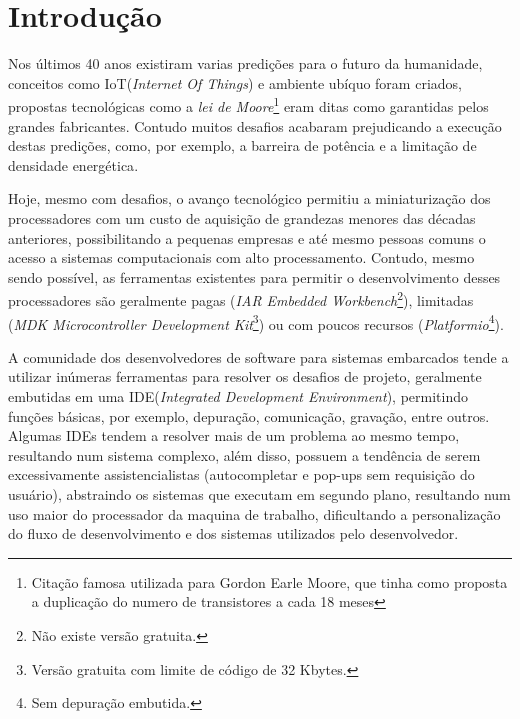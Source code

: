 \chapter{Introdução}
Nos últimos 40 anos existiram varias predições para o futuro da humanidade, conceitos como IoT(\textit{Internet Of Things})\cite{gates1995estrada} e ambiente ubíquo\cite{weiser1991computer} foram criados, propostas tecnológicas como a \textit{lei de Moore}\footnote{Citação famosa utilizada para Gordon Earle Moore, que tinha como proposta a duplicação do numero de transistores a cada 18 meses} eram ditas como garantidas pelos grandes fabricantes. Contudo muitos desafios acabaram prejudicando a execução destas predições, como, por exemplo, a barreira de potência\cite{Patterson:2008:COD:1502247} e a limitação de densidade energética\cite{paradiso2005energy}.

Hoje, mesmo com desafios, o avanço tecnológico permitiu a miniaturização dos processadores com um custo de aquisição de grandezas menores das décadas anteriores\cite{nordhaus2007two}, possibilitando a pequenas empresas e até mesmo pessoas comuns o acesso a sistemas computacionais com alto processamento. Contudo, mesmo	 sendo possível, as ferramentas existentes para permitir o desenvolvimento desses processadores são geralmente pagas (\textit{IAR Embedded Workbench}\footnote{Não existe versão gratuita.}), limitadas (\textit{MDK Microcontroller Development Kit}\footnote{Versão gratuita com limite de código de 32 Kbytes.}) ou com poucos recursos (\textit{Platformio}\footnote{Sem depuração embutida.}).

A comunidade dos desenvolvedores de software para sistemas embarcados tende a utilizar inúmeras ferramentas para resolver os desafios de projeto, geralmente embutidas em uma IDE(\textit{Integrated Development Environment}), permitindo funções básicas, por exemplo, depuração, comunicação, gravação, entre outros. Algumas IDEs tendem a resolver mais de um problema ao mesmo tempo, resultando num sistema complexo, além disso, possuem a tendência de serem excessivamente assistencialistas (autocompletar e pop-ups sem requisição do usuário), abstraindo os sistemas que executam em segundo plano, resultando num uso maior do processador da maquina de trabalho, dificultando a personalização do fluxo de desenvolvimento e dos sistemas utilizados pelo desenvolvedor.

\iffalse
O intuito deste trabalho é a realização de um sistema para possibilitar aos desenvolvedores a programação de sistemas embarcados, sem a necessidade de utilizar sistemas assistencialistas que possam limitar a evolução do trabalho ou a utilização do produto final concebido.
\fi

